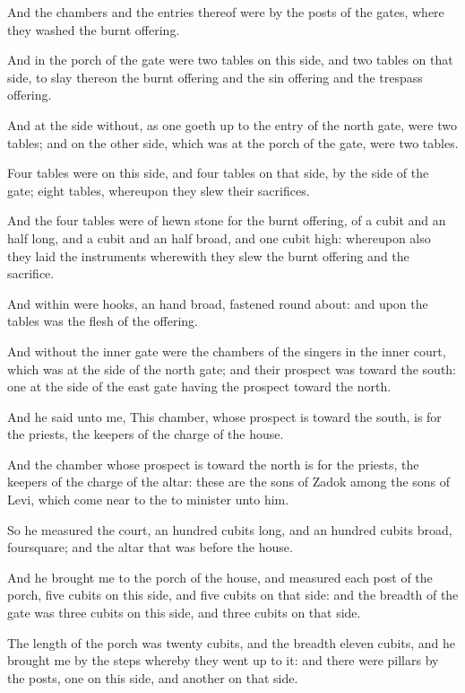 \verse And the chambers and the entries thereof were by the posts of the gates, where they washed the burnt offering.

\verse And in the porch of the gate were two tables on this side, and two tables on that side, to slay thereon the burnt offering and the sin offering and the trespass offering.

\verse And at the side without, as one goeth up to the entry of the north gate, were two tables; and on the other side, which was at the porch of the gate, were two tables.

\verse Four tables were on this side, and four tables on that side, by the side of the gate; eight tables, whereupon they slew their sacrifices.

\verse And the four tables were of hewn stone for the burnt offering, of a cubit and an half long, and a cubit and an half broad, and one cubit high: whereupon also they laid the instruments wherewith they slew the burnt offering and the sacrifice.

\verse And within were hooks, an hand broad, fastened round about: and upon the tables was the flesh of the offering.

\verse And without the inner gate were the chambers of the singers in the inner court, which was at the side of the north gate; and their prospect was toward the south: one at the side of the east gate having the prospect toward the north.

\verse And he said unto me, This chamber, whose prospect is toward the south, is for the priests, the keepers of the charge of the house.

\verse And the chamber whose prospect is toward the north is for the priests, the keepers of the charge of the altar: these are the sons of Zadok among the sons of Levi, which come near to the \LORD to minister unto him.

\verse So he measured the court, an hundred cubits long, and an hundred cubits broad, foursquare; and the altar that was before the house.

\verse And he brought me to the porch of the house, and measured each post of the porch, five cubits on this side, and five cubits on that side: and the breadth of the gate was three cubits on this side, and three cubits on that side.

\verse The length of the porch was twenty cubits, and the breadth eleven cubits, and he brought me by the steps whereby they went up to it: and there were pillars by the posts, one on this side, and another on that side.


